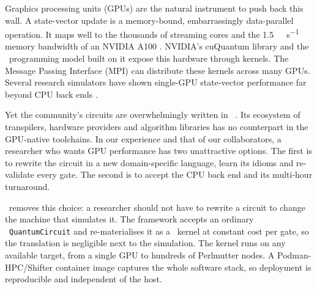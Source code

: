 Graphics processing units (GPUs) are the natural instrument to push back this wall. A state-vector update is a memory-bound, embarrassingly data-parallel operation. It maps well to the thousands of streaming cores and the \SI{1.5}{\tera\byte\per\second} memory bandwidth of an NVIDIA A100 \cite{choquette2021a100}. NVIDIA's cuQuantum library \cite{bayraktar2023cuquantum} and the \cudaq\ programming model built on it \cite{kim2023cudaquantum} expose this hardware through kernels. The Message Passing Interface (MPI) can distribute these kernels across many GPUs. Several research simulators have shown single-GPU state-vector performance far beyond CPU back ends \cite{suzuki2021qulacs,vanbeeumen2023qclabpp,doi2023multishotgpu,asadi2024pennylanelightning}.

Yet the community's circuits are overwhelmingly written in \qiskit\ \cite{javadiabhari2024qiskit}. Its ecosystem of transpilers, hardware providers and algorithm libraries has no counterpart in the GPU-native toolchains. In our experience and that of our collaborators, a researcher who wants GPU performance has two unattractive options. The first is to rewrite the circuit in a new domain-specific language, learn its idioms and re-validate every gate. The second is to accept the CPU back end and its multi-hour turnaround.

\qgear\ removes this choice: a researcher should not have to rewrite a circuit to change the machine that simulates it. The framework accepts an ordinary \qiskit\ \texttt{QuantumCircuit} and re-materialises it as a \cudaq\ kernel at constant cost per gate, so the translation is negligible next to the simulation. The kernel runs on any available target, from a single GPU to hundreds of Perlmutter nodes. A Podman-HPC/Shifter container image captures the whole software stack, so deployment is reproducible and independent of the host.


